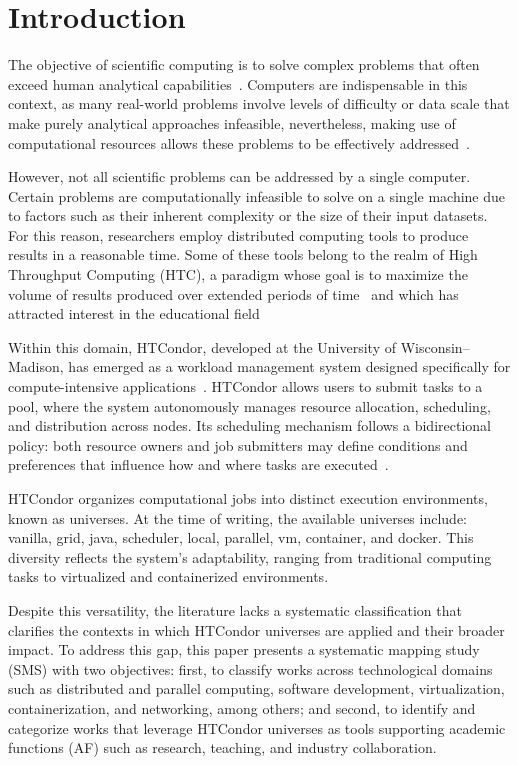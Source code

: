 \section{Introduction}\label{sec:introduccion}
The objective of scientific computing is to solve complex problems that often exceed human analytical capabilities~\cite{landau01}. Computers are indispensable in this context, as many real-world problems involve levels of difficulty or data scale that make purely analytical approaches infeasible, nevertheless, making use of computational resources allows these problems to be effectively addressed~\cite{landau01}.


However, not all scientific problems can be addressed by a single computer. Certain problems are computationally infeasible to solve on a single machine due to factors such as their inherent complexity or the size of their input datasets. For this reason, researchers employ distributed computing tools to produce results in a reasonable time. Some of these tools belong to the realm of High Throughput Computing (HTC), a paradigm whose goal is to maximize the volume of results produced over extended periods of time~\cite{juve-01} and which has attracted interest in the educational field~\cite{Senol-01}


Within this domain, HTCondor, developed at the University of Wisconsin–Madison, has emerged as a workload management system designed specifically for compute-intensive applications~\cite{chang-01, htcondor-description}. HTCondor allows users to submit tasks to a pool, where the system autonomously manages resource allocation, scheduling, and distribution across nodes. Its scheduling mechanism follows a bidirectional policy: both resource owners and job submitters may define conditions and preferences that influence how and where tasks are executed~\cite{htcondor-description}.


HTCondor organizes computational jobs into distinct execution environments, known as universes. At the time of writing, the available universes include: vanilla, grid, java, scheduler, local, parallel, vm, container, and docker. This diversity reflects the system’s adaptability, ranging from traditional computing tasks to virtualized and containerized environments.


Despite this versatility, the literature lacks a systematic classification that clarifies the contexts in which HTCondor universes are applied and their broader impact. To address this gap, this paper presents a systematic mapping study (SMS) with two objectives: first, to classify works across technological domains such as distributed and parallel computing, software development, virtualization, containerization, and networking, among others; and second, to identify and categorize works that leverage HTCondor universes as tools supporting academic functions (AF) such as research, teaching, and industry collaboration.


